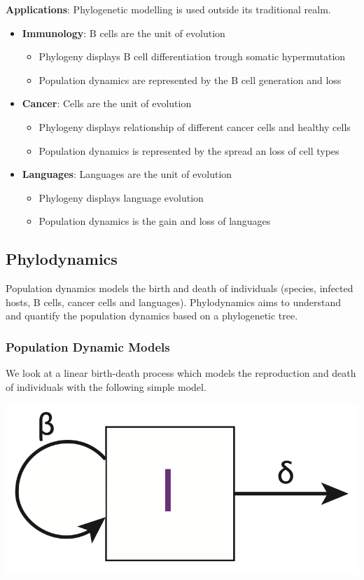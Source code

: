 \documentclass{article}
\begin{document}
\begin{multicols*}{3}
\textbf{Applications}: Phylogenetic modelling is used outside its traditional realm. 
\begin{itemize}
    \item \textbf{Immunology}: B cells are the unit of evolution 
    \begin{itemize}
        \item Phylogeny displays B cell differentiation trough somatic hypermutation
        \item Population dynamics are represented by the B cell generation and loss
    \end{itemize}
    \item \textbf{Cancer}: Cells are the unit of evolution 
    \begin{itemize}
        \item Phylogeny displays relationship of different cancer cells and healthy cells 
        \item Population dynamics is represented by the spread an loss of cell types 
    \end{itemize}
    \item \textbf{Languages}: Languages are the unit of evolution 
    \begin{itemize}
        \item Phylogeny displays language evolution
        \item Population dynamics is the gain and loss of languages
    \end{itemize}
\end{itemize}

\subsection{Phylodynamics}

Population dynamics models the birth and death of individuals (species, infected hosts, B cells, cancer cells and languages). Phylodynamics aims to understand and quantify the population dynamics based on a phylogenetic tree. 

\subsubsection{Population Dynamic Models}

We look at a linear birth-death process which models the reproduction and death of individuals with the following simple model. 

\begin{center}
    \includegraphics[width=0.6\linewidth, angle=0.0]{birthdeath.png}
\end{center}


\end{multicols*}
\end{document}
